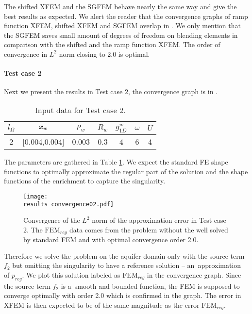 The shifted XFEM and the SGFEM behave nearly the same way and give the best results as expected.
We alert the reader that the convergence graphs of ramp function XFEM, shifted XFEM and SGFEM overlap in .
We only mention that the SGFEM saves small amount of degrees of freedom on blending elements in comparison
with the shifted and the ramp function XFEM. The order of convergence in $L^2$ norm closing to 2.0 is optimal.


\paragraph{Test case 2}
Next we present the results in Test case 2, the convergence graph is in .
%
\begin{table}[!htb]
\begin{center}
\begin{tabular}{ccccccc}
\toprule
$l_\Omega$ & $\mathbf{\boldsymbol{x}}_w$  & $\rho_w$ & $R_w$ & $g^w_{1D}$ & $\omega$ & $U$ \\
\midrule
2 & [0.004,0.004] & 0.003 & 0.3 & 4 & 6 & 4\\
\bottomrule
\end{tabular}
\caption{Input data for Test case 2.}
\label{tab:test_case_2_data}
\end{center}
\end{table}
%
The parameters are gathered in Table \ref{tab:test_case_2_data}.
We expect the standard FE shape functions to optimally approximate the regular part of the solution
and the shape functions of the enrichment to capture the singularity.
%
\begin{figure}[!htb]
  \centering    
  \texttt{[image: \\results convergence02.pdf]}
  \caption[Convergence graph in Test case 2]{Convergence of the $L^2$ norm of the approximation error in Test case 2. The $\textrm{FEM}_{reg}$
  data comes from the problem without the well solved by standard FEM and with optimal convergence order 2.0.}
  \label{fig:convergence02}
\end{figure}
%
Therefore we solve the problem on the aquifer domain only with the source term $f_2$ but omitting the singularity
to have a reference solution -- an~approximation of $p_{reg}$. We plot this solution labeled as $\textrm{FEM}_{reg}$ in the convergence graph.
Since the source term $f_2$ is a~smooth and bounded function, the FEM is supposed to converge optimally with order 2.0
which is confirmed in the graph.
The error in XFEM is then expected to be of the same magnitude as the error $\textrm{FEM}_{reg}$.

